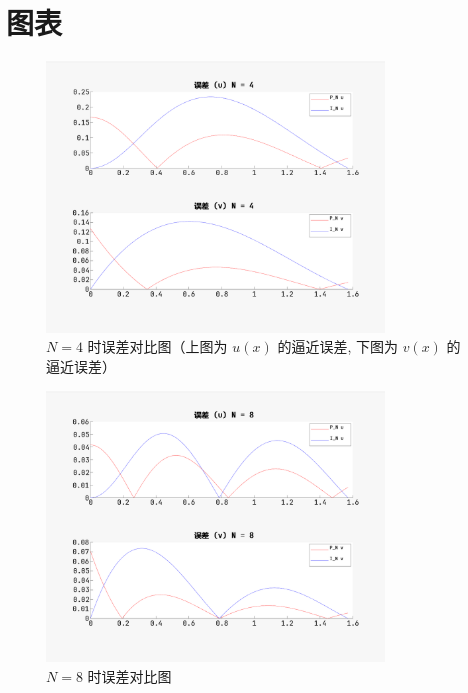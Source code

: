 \documentclass{article}
\begin{document}
	\section{图表}

		\begin{figure}[htbp]
			\centering
			\includegraphics[width=0.8\textwidth]{figure/error_04.png}
			\caption{$N=4$ 时误差对比图（上图为 $u(x)$ 的逼近误差, 下图为 $v(x)$ 的逼近误差）}
		\end{figure}

		\begin{figure}[htbp]
			\centering
			\includegraphics[width=0.8\textwidth]{figure/error_08.png}
			\caption{$N=8$ 时误差对比图}
		\end{figure}
\end{document}
